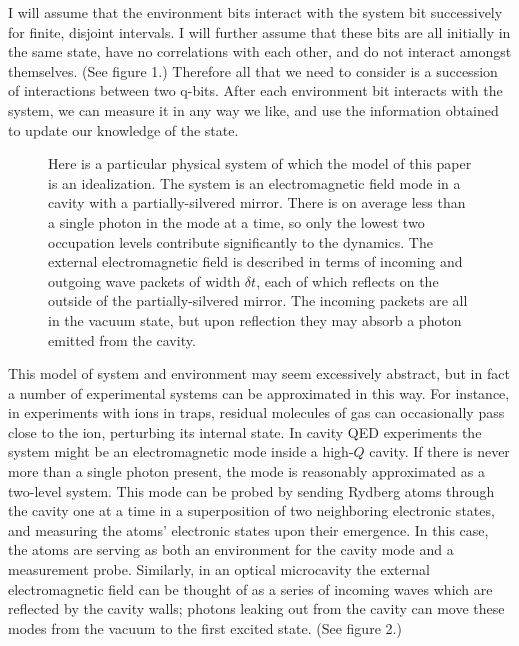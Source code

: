 \documentclass[12pt]{article}
\begin{document}
I will assume that the environment bits interact
with the system bit successively for finite, disjoint intervals.
I will further assume that these bits
are all initially in the same state, have no correlations with each other,
and do not interact amongst themselves.  (See figure 1.)  Therefore all
that we need to consider is a succession of interactions between two q-bits.
After each environment bit interacts with the system, we can measure it
in any way we like, and use the information obtained to update our
knowledge of the state.

\begin{figure}[ht]
\begin{center}
\label{fig2}
\end{center}
\caption{\small Here is a particular physical system of which the model
of this paper is an idealization.  The system is an electromagnetic
field mode in a cavity with a partially-silvered mirror.  There is on
average less than a single photon in the mode at a time, so only the
lowest two occupation levels contribute significantly to the dynamics.
The external electromagnetic field is described in terms of incoming
and outgoing wave packets of width $\delta t$, each of which reflects
on the outside of the partially-silvered mirror.  The incoming packets
are all in the vacuum state, but upon reflection they may absorb a
photon emitted from the cavity.}
\end{figure}

This model of system and environment may seem excessively abstract,
but in fact a number of experimental systems can be approximated in this
way.  For instance, in experiments with ions in traps, residual molecules
of gas can occasionally pass close to the ion, perturbing its internal
state.  In cavity QED experiments the system might be an electromagnetic
mode inside a high-$Q$ cavity.  If there is never more than a single
photon present, the mode is reasonably approximated as a two-level system.
This mode can be probed by sending Rydberg atoms through the cavity one at
a time in a superposition of two neighboring electronic states,
and measuring the atoms' electronic states upon their emergence.  In this
case, the atoms are serving as both an environment for the cavity mode
and a measurement probe.  Similarly, in an optical microcavity the
external electromagnetic field can be thought of as a series of incoming
waves which are reflected by the cavity walls; photons leaking out from the
cavity can move these modes from the vacuum to the first excited state.
(See figure 2.)
\end{document}

